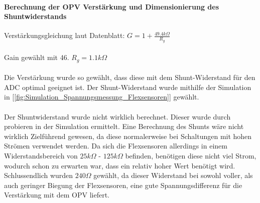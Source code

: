 \documentclass[titlepage,12pt,twoside]{article}
\begin{document}
\paragraph{Berechnung der OPV Verstärkung und Dimensionierung des Shuntwiderstands}
\hfill \break
\hfill \break
\hspace*{1cm} Verstärkungsgleichung laut Datenblatt: $ G = 1+\frac{49.4k\Omega}{R_{g}} $ \\
\\
\hspace*{1cm} Gain gewählt mit 46. \hspace*{1cm} $ R_{g} = 1.1k\Omega $ \\
\\
Die Verstärkung wurde so gewählt, dass diese mit dem Shunt-Widerstand für den ADC optimal geeignet ist.
Der Shunt-Widerstand wurde mithilfe der Simulation in [\textcolor{blue}{\autoref{fig:Simulation_Spannungsmessung_Flexsensoren}}]
gewählt. \\
\\
Der Shuntwiderstand wurde nicht wirklich berechnet. Dieser wurde durch probieren in der Simulation ermittelt. Eine Berechnung
des Shunts wäre nicht wirklich Zielführend gewesen, da diese normalerweise bei Schaltungen mit hohen Strömen verwendet werden. 
Da sich die Flexsensoren allerdings in einem Widerstandsbereich von $25k\Omega$ - $125k\Omega$ befinden, benötigen diese nicht
viel Strom, wodurch schon zu erwarten war, dass ein relativ hoher Wert benötigt wird. Schlussendlich wurden $240\Omega$ gewählt,
da dieser Widerstand bei sowohl voller, als auch geringer Biegung der Flexsensoren, eine gute Spannungsdifferenz für die 
Verstärkung mit dem OPV liefert.
\end{document}
